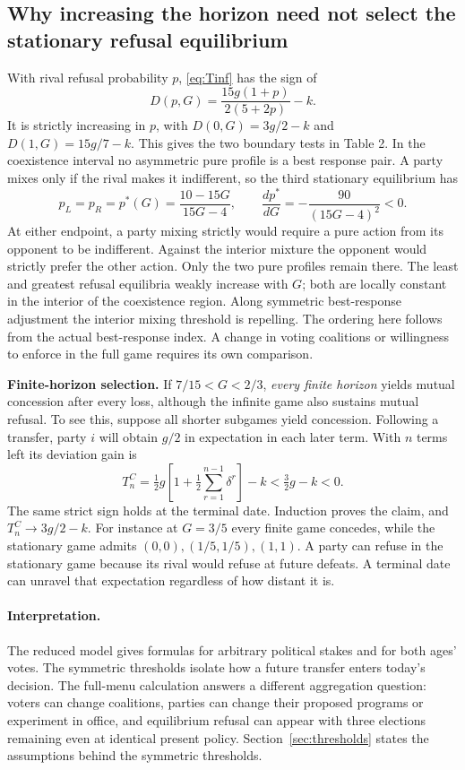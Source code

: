 \documentclass[11pt,letterpaper]{article}
\newcommand{\statement}[1]{\textbf{#1}\enspace}
\begin{document}
\newpage
\subsection*{Why increasing the horizon need not select the stationary refusal equilibrium}
With rival refusal probability \(p\), \eqref{eq:Tinf} has the sign of
\[
 D(p,G)=\frac{15g(1+p)}{2(5+2p)}-k .
\]
It is strictly increasing in \(p\), with \(D(0,G)=3g/2-k\) and \(D(1,G)=15g/7-k\). This gives the two boundary tests in Table 2. In the coexistence interval no asymmetric pure profile is a best response pair. A party mixes only if the rival makes it indifferent, so the third stationary equilibrium has
\[
 p_L=p_R=p^*(G)=\frac{10-15G}{15G-4},\qquad
 \frac{dp^*}{dG}=-\frac{90}{(15G-4)^2}<0 .
\]
At either endpoint, a party mixing strictly would require a pure action from its opponent to be indifferent. Against the interior mixture the opponent would strictly prefer the other action. Only the two pure profiles remain there. The least and greatest refusal equilibria weakly increase with \(G\); both are locally constant in the interior of the coexistence region. Along symmetric best-response adjustment the interior mixing threshold is repelling. The ordering here follows from the actual best-response index. A change in voting coalitions or willingness to enforce in the full game requires its own comparison.

\statement{Finite-horizon selection.} If \(7/15<G<2/3\), \emph{every finite horizon} yields mutual concession after every loss, although the infinite game also sustains mutual refusal. To see this, suppose all shorter subgames yield concession. Following a transfer, party \(i\) will obtain \(g/2\) in expectation in each later term. With \(n\) terms left its deviation gain is
\[
 T_n^{C}=\tfrac12g\left[1+\tfrac12\sum_{r=1}^{n-1}\delta^r\right]-k
       <\tfrac32g-k<0.
\]
The same strict sign holds at the terminal date. Induction proves the claim, and \(T_n^C\to3g/2-k\). For instance at \(G=3/5\) every finite game concedes, while the stationary game admits \((0,0),(1/5,1/5),(1,1)\). A party can refuse in the stationary game because its rival would refuse at future defeats. A terminal date can unravel that expectation regardless of how distant it is.

\paragraph{Interpretation.}
The reduced model gives formulas for arbitrary political stakes and for both ages' votes. The symmetric thresholds isolate how a future transfer enters today's decision. The full-menu calculation answers a different aggregation question: voters can change coalitions, parties can change their proposed programs or experiment in office, and equilibrium refusal can appear with three elections remaining even at identical present policy. Section~\ref{sec:thresholds} states the assumptions behind the symmetric thresholds.
\end{document}

